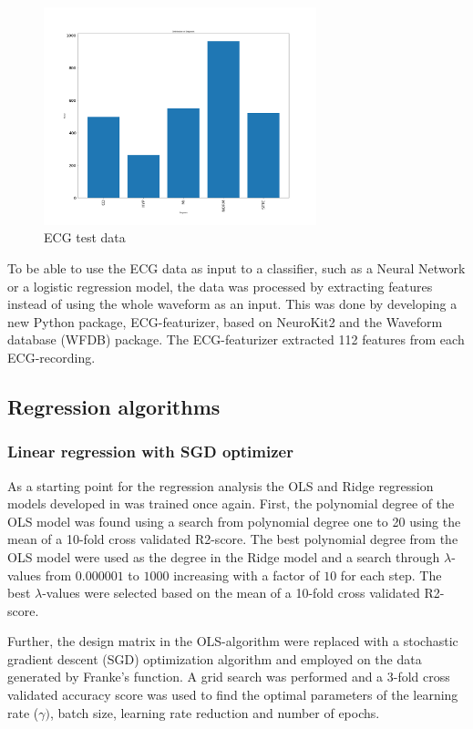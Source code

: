 \documentclass[twocolumn]{cinc}
\begin{document}
\begin{figure}[!htb]
\includegraphics[width=7.9cm]{Figures/distribution_test.png}
\caption{ECG test data}
\label{fig:ECGtest}
\end{figure}

To be able to use the ECG data as input to a classifier, such as a Neural Network or a logistic regression model, the data was processed by extracting features instead of using the whole waveform as an input. This was done by developing a new Python package, ECG-featurizer\cite{bjorn-jostein_singstad_ecg-featurizer_nodate}, based on NeuroKit2 \cite{makowski_neurokit2_2020} and the Waveform database (WFDB) package. The ECG-featurizer extracted 112 features from each ECG-recording.


\subsection{Regression algorithms}
\subsubsection{Linear regression with SGD optimizer}
As a starting point for the regression analysis the OLS and Ridge regression models developed in \cite{bjorn-jostein_singstad_using_nodate} was trained once again. First, the polynomial degree of the OLS model was found using a search from polynomial degree one to 20 using the mean of a 10-fold cross validated R2-score.
The best polynomial degree from the OLS model were used as the degree in the Ridge model and a search through $\lambda$-values from $0.000001$ to $1000$ increasing with a factor of $10$ for each step. The best $\lambda$-values were selected based on the mean of a 10-fold cross validated R2-score.

Further, the design matrix in the OLS-algorithm were replaced with a stochastic gradient descent (SGD) optimization algorithm and employed on the data generated by Franke's function. A grid search was performed and a 3-fold cross validated accuracy score was used to find the optimal parameters of the learning rate ($\gamma)$, batch size, learning rate reduction and number of epochs.
\end{document}
